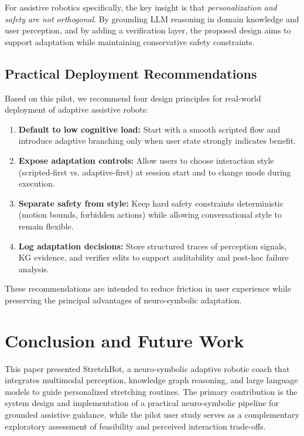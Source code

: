 \documentclass[pdflatex,sn-basic,Numbered,iicol,twocolumn]{sn-jnl}%
\begin{document}
For assistive robotics specifically, the key insight is that \textit{personalization and safety are not orthogonal}. By grounding LLM reasoning in domain knowledge and user perception, and by adding a verification layer, the proposed design aims to support adaptation while maintaining conservative safety constraints.

\subsection{Practical Deployment Recommendations}

Based on this pilot, we recommend four design principles for real-world deployment of adaptive assistive robots:

\begin{enumerate}
\item \textbf{Default to low cognitive load:} Start with a smooth scripted flow and introduce adaptive branching only when user state strongly indicates benefit.

\item \textbf{Expose adaptation controls:} Allow users to choose interaction style (scripted-first vs. adaptive-first) at session start and to change mode during execution.

\item \textbf{Separate safety from style:} Keep hard safety constraints deterministic (motion bounds, forbidden actions) while allowing conversational style to remain flexible.

\item \textbf{Log adaptation decisions:} Store structured traces of perception signals, KG evidence, and verifier edits to support auditability and post-hoc failure analysis.
\end{enumerate}

These recommendations are intended to reduce friction in user experience while preserving the principal advantages of neuro-symbolic adaptation.
\section{Conclusion and Future Work}
\label{sec:conclusion}

This paper presented StretchBot, a neuro-symbolic adaptive robotic coach that integrates multimodal perception, knowledge graph reasoning, and large language models to guide personalized stretching routines. The primary contribution is the system design and implementation of a practical neuro-symbolic pipeline for grounded assistive guidance, while the pilot user study serves as a complementary exploratory assessment of feasibility and perceived interaction trade-offs.
\end{document}

